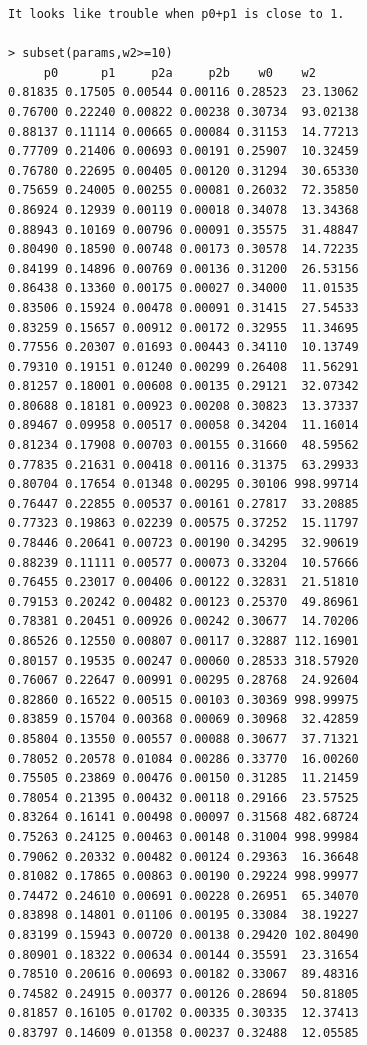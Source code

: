 \documentclass[12pt,letterpaper]{article}\usepackage[]{graphicx}\usepackage[]{color}
\begin{document}
\clearpage

\begin{lstlisting}
It looks like trouble when p0+p1 is close to 1.

> subset(params,w2>=10)
     p0      p1     p2a     p2b    w0    w2
0.81835 0.17505 0.00544 0.00116 0.28523  23.13062
0.76700 0.22240 0.00822 0.00238 0.30734  93.02138
0.88137 0.11114 0.00665 0.00084 0.31153  14.77213
0.77709 0.21406 0.00693 0.00191 0.25907  10.32459
0.76780 0.22695 0.00405 0.00120 0.31294  30.65330
0.75659 0.24005 0.00255 0.00081 0.26032  72.35850
0.86924 0.12939 0.00119 0.00018 0.34078  13.34368
0.88943 0.10169 0.00796 0.00091 0.35575  31.48847
0.80490 0.18590 0.00748 0.00173 0.30578  14.72235
0.84199 0.14896 0.00769 0.00136 0.31200  26.53156
0.86438 0.13360 0.00175 0.00027 0.34000  11.01535
0.83506 0.15924 0.00478 0.00091 0.31415  27.54533
0.83259 0.15657 0.00912 0.00172 0.32955  11.34695
0.77556 0.20307 0.01693 0.00443 0.34110  10.13749
0.79310 0.19151 0.01240 0.00299 0.26408  11.56291
0.81257 0.18001 0.00608 0.00135 0.29121  32.07342
0.80688 0.18181 0.00923 0.00208 0.30823  13.37337
0.89467 0.09958 0.00517 0.00058 0.34204  11.16014
0.81234 0.17908 0.00703 0.00155 0.31660  48.59562
0.77835 0.21631 0.00418 0.00116 0.31375  63.29933
0.80704 0.17654 0.01348 0.00295 0.30106 998.99714
0.76447 0.22855 0.00537 0.00161 0.27817  33.20885
0.77323 0.19863 0.02239 0.00575 0.37252  15.11797
0.78446 0.20641 0.00723 0.00190 0.34295  32.90619
0.88239 0.11111 0.00577 0.00073 0.33204  10.57666
0.76455 0.23017 0.00406 0.00122 0.32831  21.51810
0.79153 0.20242 0.00482 0.00123 0.25370  49.86961
0.78381 0.20451 0.00926 0.00242 0.30677  14.70206
0.86526 0.12550 0.00807 0.00117 0.32887 112.16901
0.80157 0.19535 0.00247 0.00060 0.28533 318.57920
0.76067 0.22647 0.00991 0.00295 0.28768  24.92604
0.82860 0.16522 0.00515 0.00103 0.30369 998.99975
0.83859 0.15704 0.00368 0.00069 0.30968  32.42859
0.85804 0.13550 0.00557 0.00088 0.30677  37.71321
0.78052 0.20578 0.01084 0.00286 0.33770  16.00260
0.75505 0.23869 0.00476 0.00150 0.31285  11.21459
0.78054 0.21395 0.00432 0.00118 0.29166  23.57525
0.83264 0.16141 0.00498 0.00097 0.31568 482.68724
0.75263 0.24125 0.00463 0.00148 0.31004 998.99984
0.79062 0.20332 0.00482 0.00124 0.29363  16.36648
0.81082 0.17865 0.00863 0.00190 0.29224 998.99977
0.74472 0.24610 0.00691 0.00228 0.26951  65.34070
0.83898 0.14801 0.01106 0.00195 0.33084  38.19227
0.83199 0.15943 0.00720 0.00138 0.29420 102.80490
0.80901 0.18322 0.00634 0.00144 0.35591  23.31654
0.78510 0.20616 0.00693 0.00182 0.33067  89.48316
0.74582 0.24915 0.00377 0.00126 0.28694  50.81805
0.81857 0.16105 0.01702 0.00335 0.30335  12.37413
0.83797 0.14609 0.01358 0.00237 0.32488  12.05585
\end{lstlisting}
\end{document}
